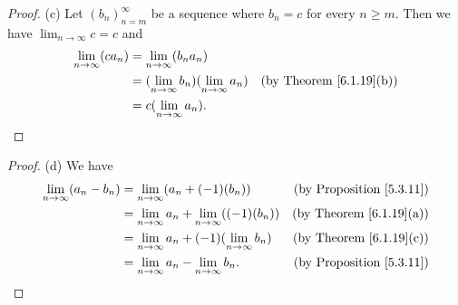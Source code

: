 \begin{proof}{(c)}
    Let \((b_n)_{n = m}^\infty\) be a sequence where \(b_n = c \) for every \(n \geq m\).
    Then we have \(\lim_{n \to \infty} c = c\) and
    \begin{align*}
        \lim_{n \to \infty} (c a_n) & = \lim_{n \to \infty} (b_n a_n)                                                            \\
                                    & = (\lim_{n \to \infty} b_n)(\lim_{n \to \infty} a_n) & \text{(by Theorem \ref{6.1.19}(b))} \\
                                    & = c(\lim_{n \to \infty} a_n).
    \end{align*}
\end{proof}

\begin{proof}{(d)}
    We have
    \begin{align*}
        \lim_{n \to \infty} (a_n - b_n) & = \lim_{n \to \infty} (a_n + (-1)(b_n))                     & \text{(by Proposition \ref{5.3.11})} \\
                                        & = \lim_{n \to \infty} a_n + \lim_{n \to \infty} ((-1)(b_n)) & \text{(by Theorem \ref{6.1.19}(a))}  \\
                                        & = \lim_{n \to \infty} a_n + (-1)(\lim_{n \to \infty} b_n)   & \text{(by Theorem \ref{6.1.19}(c))}  \\
                                        & = \lim_{n \to \infty} a_n - \lim_{n \to \infty} b_n.        & \text{(by Proposition \ref{5.3.11})}
    \end{align*}
\end{proof}

